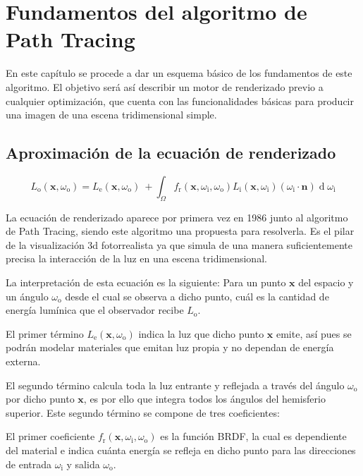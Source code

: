 \chapter{Fundamentos del algoritmo de Path Tracing}
	

En este capítulo se procede a dar un esquema básico de los fundamentos de este algoritmo. El objetivo será así describir un motor de renderizado previo a cualquier optimización, que cuenta con las funcionalidades básicas para producir una imagen de una escena tridimensional simple.

	\section{Aproximación de la ecuación de renderizado}
\[
{\displaystyle L_{\text{o}}(\mathbf {x} ,\omega _{\text{o}})=L_{\text{e}}(\mathbf {x} ,\omega _{\text{o}})\ +\int _{\Omega }f_{\text{r}}(\mathbf {x} ,\omega _{\text{i}},\omega _{\text{o}})L_{\text{i}}(\mathbf {x} ,\omega _{\text{i}})(\omega _{\text{i}}\cdot \mathbf {n} )\operatorname {d} \omega _{\text{i}}}
\]

La ecuación de renderizado \cite{therenderingequation} aparece por primera vez en 1986 junto al algoritmo de Path Tracing, siendo este algoritmo una propuesta para resolverla. Es el pilar de la visualización 3d fotorrealista ya que simula de una manera suficientemente precisa la interacción de la luz en una escena tridimensional.

La interpretación de esta ecuación es la siguiente: Para un punto $\mathbf {x}$ del espacio y un ángulo $\omega _{\text{o}}$ desde el cual se observa a dicho punto, cuál es la cantidad de energía lumínica que el observador recibe $L_{\text{o}}$.

El primer término $L_{\text{e}}(\mathbf {x} ,\omega _{\text{o}})$ indica la luz que dicho punto $\mathbf {x}$ emite, así pues se podrán modelar materiales que emitan luz propia y no dependan de energía externa.

El segundo término calcula toda la luz entrante y reflejada a través del ángulo $\omega _{\text{o}}$ por dicho punto $\mathbf {x}$, es por ello que integra todos los ángulos del hemisferio superior. Este segundo término se compone de tres coeficientes:

El primer coeficiente $f_{\text{r}}(\mathbf {x} ,\omega _{\text{i}},\omega _{\text{o}})$ es la función BRDF, la cual es dependiente del material e indica cuánta energía se refleja en dicho punto para las direcciones de entrada $\omega _{\text{i}}$ y salida $\omega _{\text{o}}$.

